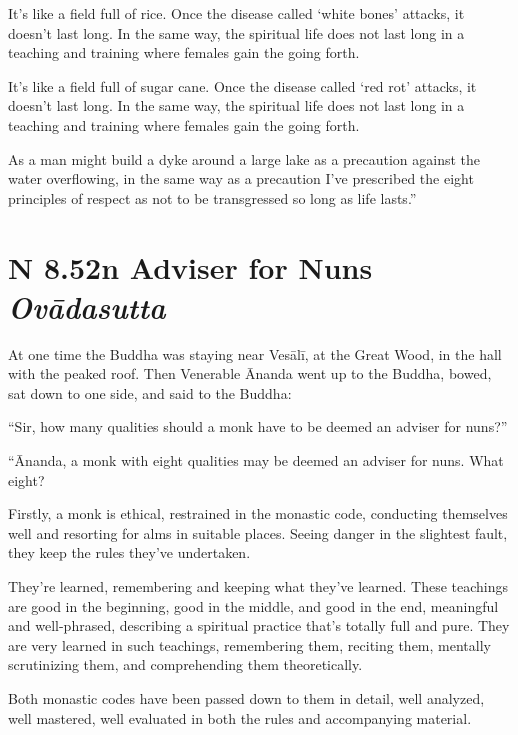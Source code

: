 \documentclass[12pt,openany]{book}%
\newcommand*{\suttatitleacronym}[1]{\smaller[2]{#1}\vspace*{.3em}}
\newcommand*{\suttatitletranslation}[1]{\linebreak{#1}}
\newcommand*{\suttatitleroot}[1]{\linebreak\smaller[2]\itshape{#1}}
\newcommand*{\tocacronym}[1]{\hspace*{-3.3em}{#1}\quad}
\newcommand*{\toctranslation}[1]{#1}
\newcommand*{\tocroot}[1]{(\textit{#1})}
\begin{document}
It’s like a field full of rice. Once the disease called ‘white bones’ attacks, it doesn’t last long. In the same way, the spiritual life does not last long in a teaching and training where females gain the going forth. 

It’s like a field full of sugar cane. Once the disease called ‘red rot’ attacks, it doesn’t last long. In the same way, the spiritual life does not last long in a teaching and training where females gain the going forth. 

As a man might build a dyke around a large lake as a precaution against the water overflowing, in the same way as a precaution I’ve prescribed the eight principles of respect as not to be transgressed so long as life lasts.” 

%
\section*{{\suttatitleacronym AN 8.52}{\suttatitletranslation An Adviser for Nuns }{\suttatitleroot Ovādasutta}}
\addcontentsline{toc}{section}{\tocacronym{AN 8.52} \toctranslation{An Adviser for Nuns } \tocroot{Ovādasutta}}

At one time the Buddha was staying near \textsanskrit{Vesālī}, at the Great Wood, in the hall with the peaked roof. Then Venerable Ānanda went up to the Buddha, bowed, sat down to one side, and said to the Buddha: 

“Sir, how many qualities should a monk have to be deemed an adviser for nuns?” 

“Ānanda, a monk with eight qualities may be deemed an adviser for nuns. What eight? 

Firstly, a monk is ethical, restrained in the monastic code, conducting themselves well and resorting for alms in suitable places. Seeing danger in the slightest fault, they keep the rules they’ve undertaken. 

They’re learned, remembering and keeping what they’ve learned. These teachings are good in the beginning, good in the middle, and good in the end, meaningful and well-phrased, describing a spiritual practice that’s totally full and pure. They are very learned in such teachings, remembering them, reciting them, mentally scrutinizing them, and comprehending them theoretically. 

Both monastic codes have been passed down to them in detail, well analyzed, well mastered, well evaluated in both the rules and accompanying material. 
\end{document}
